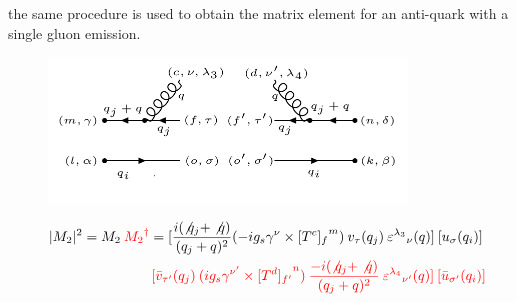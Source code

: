 %
the same procedure is used to obtain the matrix element for an anti-quark with a single gluon emission.
\begin{figure}[h!]
\centering
\includegraphics[width=0.85\textwidth]{images/QQ/qbargqMSquer.png}
\end{figure}

\begin{equation}
\begin{split}
|M_2|^2=M_2\:{\color[RGB]{255,0,0} {M_2}^{\dagger}} = [\frac{i(\not{q_j} + \not{q})}{(q_j + q)^2} (-ig_s \gamma^{\nu}\times {[T^c]_f}^m) \:{v}_{\tau}(q_j)\: {\varepsilon^{\lambda_3}}_{\nu} (q)]\: [{u}_{\sigma}(q_i)]\: \\
\quad\quad\quad\quad\quad\quad\quad\quad\:\:{\color[RGB]{255,0,0}[\bar{v}_{{\tau}^{\prime}}(q_j) \: (ig_s \gamma^{{\nu}^{\prime}}\times {[T^d]_{f^{\prime}}}^n) \: \frac{-i(\not{q_j} + \not{q})}{(q_j + q)^2} \: {\varepsilon^{\lambda_4}}_{{\nu}^{\prime}} (q)]\: [\bar{u}_{{\sigma}^{\prime}}(q_i)]}
\end{split}
\end{equation}


